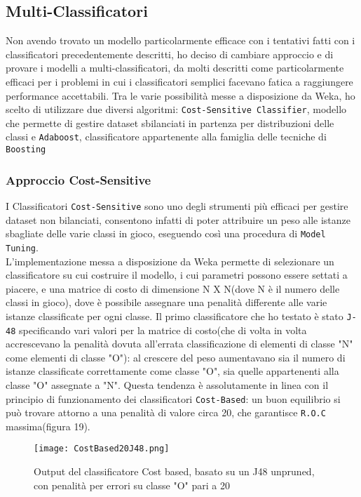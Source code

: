   \subsection{Multi-Classificatori}
Non avendo trovato un modello particolarmente efficace con i tentativi fatti con i classificatori precedentemente descritti, ho deciso di cambiare approccio e di provare i modelli a multi-classificatori, da molti descritti come particolarmente efficaci per i problemi in cui i classificatori semplici  facevano fatica a raggiungere performance accettabili.
Tra le varie possibilità messe a disposizione da Weka, ho scelto di utilizzare due diversi algoritmi: \texttt{Cost-Sensitive Classifier}, modello che permette di gestire dataset sbilanciati in partenza per distribuzioni delle classi e \texttt{Adaboost}, classificatore appartenente alla famiglia delle tecniche di \texttt{Boosting}
  \subsubsection{Approccio Cost-Sensitive}
  I Classificatori \texttt{Cost-Sensitive} sono uno degli strumenti più efficaci per gestire dataset non bilanciati, consentono infatti di poter attribuire un peso alle istanze sbagliate delle varie classi in gioco, eseguendo così una procedura di \texttt{Model Tuning}.\\
  L'implementazione messa a disposizione da Weka permette di selezionare un classificatore su cui costruire il modello, i cui parametri possono essere settati a piacere, e una matrice di costo di dimensione N X N(dove N è il numero delle classi in gioco), dove è possibile assegnare una penalità differente alle varie istanze classificate per ogni classe.
  Il primo classificatore che ho testato è stato \texttt{J-48} specificando vari valori per la matrice di costo(che di volta in volta accrescevano la penalità dovuta all'errata classificazione di elementi di classe "N" come elementi di classe "O"): al crescere del peso aumentavano sia il numero di istanze classificate correttamente come classe "O", sia quelle appartenenti alla classe "O" assegnate a "N".
  Questa tendenza è assolutamente in linea con il principio di funzionamento dei classificatori \texttt{Cost-Based}: un buon equilibrio si può trovare attorno a una penalità di valore circa 20, che garantisce \texttt{R.O.C} massima(figura 19).
  
  \begin{figure}[H]
  	\texttt{[image: CostBased20J48.png]}
  	\caption{Output del classificatore Cost based, basato su un J48 unpruned, con penalità per errori su classe "O" pari a 20 }
  \end{figure} 

